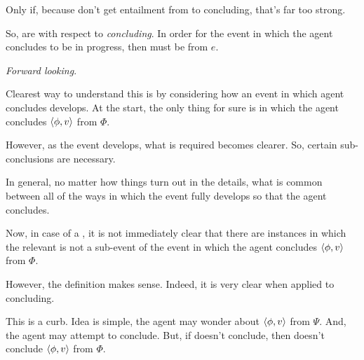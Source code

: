 \begin{note}
  {
    \color{red}
    Only if, because don't get entailment from \pevent{} to concluding, that's far too strong.
  }

  So,  are with respect to \emph{concluding}.
  In order for the event in which the agent concludes to be in progress, then must be \pevent{} from \(e\).

  \emph{Forward looking}.

  Clearest way to understand this is by considering how an event in which agent concludes develops.
  At the start, the only thing for sure is \pevent{} in which the agent concludes \(\langle \phi, v \rangle\) from \(\Phi\).

  However, as the event develops, what is required becomes clearer.
  So, certain sub-conclusions are necessary.

  In general, no matter how things turn out in the details, what is common between all of the ways in which the event fully develops so that the agent concludes.
\end{note}

\begin{note}
  Now, in case of a \curb{}, it is not immediately clear that there are instances in which the relevant \pevent{} is not a sub-event of the event in which the agent concludes \(\langle \phi, v \rangle\) from \(\Phi\).

  However, the definition makes sense.
  Indeed, it is very clear when applied to concluding.
\end{note}

\begin{note}
  This is a curb.
  Idea is simple, the agent may wonder about \(\langle \phi, v \rangle\) from \(\Psi\).
  And, the agent may attempt to conclude.
  But, if doesn't conclude, then doesn't conclude \(\langle \phi, v \rangle\) from \(\Phi\).
\end{note}

